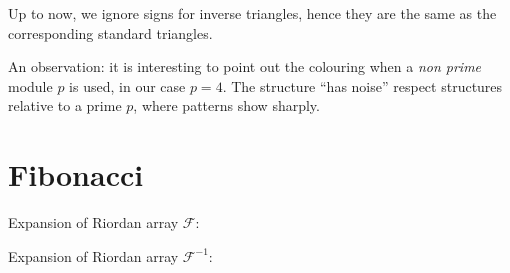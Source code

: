 \documentclass[11pt,a4paper]{article} %
\begin{document}
    Up to now, we ignore signs for inverse triangles, hence they are the same as the corresponding standard triangles.

    An observation: it is interesting to point out the colouring when a \emph{non prime} module $p$ is used, in
    our case $p=4$. The structure ``has noise'' respect structures relative to a prime $p$, where patterns
    show sharply.


    
    
    
    


    \section{Fibonacci}

    Expansion of Riordan array $\mathcal{F}$:
    
    Expansion of Riordan array $\mathcal{F}^{-1}$:
    

    
    

    
    
\end{document}
